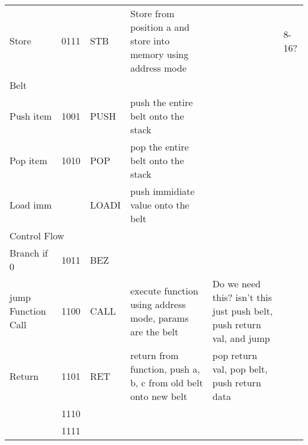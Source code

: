 \documentclass{article}
\begin{document}
\begin{tabular}{llllll}
    Store         & 0111   & STB      & Store from position a and store into memory using address mode          &                                                                       & 8-16?           \\
    \multicolumn{5}{l}{Belt}                                                                                                                                                            &                 \\
    Push item     & 1001   & PUSH     & push the entire belt onto the stack                                     &                                                                       &                 \\
    Pop item      & 1010   & POP      & pop the entire belt onto the stack                                      &                                                                       &                 \\
    Load imm      &        & LOADI    & push immidiate value onto the belt                                      &                                                                       &                 \\
    \multicolumn{5}{l}{Control Flow}                                                                                                                                                    &                 \\
    Branch if 0   & 1011   & BEZ      &                                                                         &                                                                       &                 \\
    jump 
    Function Call & 1100   & CALL     & execute function using address mode, params are the belt                & Do we need this? isn't this just push belt, push return val, and jump &                 \\
    Return        & 1101   & RET      & return from function, push a, b, c from old belt onto new belt          & pop return val, pop belt, push return data                            &                 \\
                  & 1110   &          &                                                                         &                                                                       &                 \\
                  & 1111   &          &                                                                         &                                                                       &                
    \end{tabular}
\end{document}
